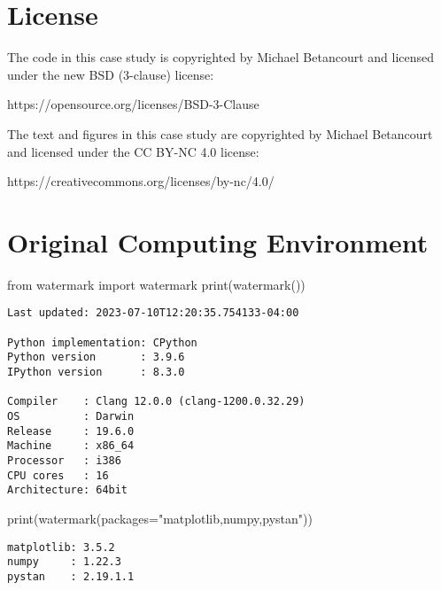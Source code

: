 \documentclass[
  letterpaper,
  DIV=11,
  numbers=noendperiod]{scrartcl}
\newenvironment{Shaded}{\begin{snugshade}}{\end{snugshade}}
\newcommand{\BuiltInTok}[1]{\textcolor[rgb]{0.00,0.23,0.31}{#1}}
\newcommand{\ImportTok}[1]{\textcolor[rgb]{0.00,0.46,0.62}{#1}}
\newcommand{\NormalTok}[1]{\textcolor[rgb]{0.00,0.23,0.31}{#1}}
\newcommand{\OperatorTok}[1]{\textcolor[rgb]{0.37,0.37,0.37}{#1}}
\newcommand{\StringTok}[1]{\textcolor[rgb]{0.13,0.47,0.30}{#1}}
\begin{document}
\hypertarget{license}{%
\section*{License}\label{license}}

The code in this case study is copyrighted by Michael Betancourt and
licensed under the new BSD (3-clause) license:

https://opensource.org/licenses/BSD-3-Clause

The text and figures in this case study are copyrighted by Michael
Betancourt and licensed under the CC BY-NC 4.0 license:

https://creativecommons.org/licenses/by-nc/4.0/

\hypertarget{original-computing-environment}{%
\section*{Original Computing
Environment}\label{original-computing-environment}}

\begin{Shaded}
\begin{Highlighting}[]
\ImportTok{from}\NormalTok{ watermark }\ImportTok{import}\NormalTok{ watermark}
\BuiltInTok{print}\NormalTok{(watermark())}
\end{Highlighting}
\end{Shaded}

\begin{verbatim}
Last updated: 2023-07-10T12:20:35.754133-04:00

Python implementation: CPython
Python version       : 3.9.6
IPython version      : 8.3.0

Compiler    : Clang 12.0.0 (clang-1200.0.32.29)
OS          : Darwin
Release     : 19.6.0
Machine     : x86_64
Processor   : i386
CPU cores   : 16
Architecture: 64bit
\end{verbatim}

\begin{Shaded}
\begin{Highlighting}[]
\BuiltInTok{print}\NormalTok{(watermark(packages}\OperatorTok{=}\StringTok{"matplotlib,numpy,pystan"}\NormalTok{))}
\end{Highlighting}
\end{Shaded}

\begin{verbatim}
matplotlib: 3.5.2
numpy     : 1.22.3
pystan    : 2.19.1.1
\end{verbatim}
\end{document}
